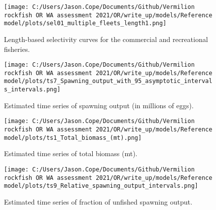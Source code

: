 \documentclass[11pt,
  english,
  a4paper,
]{article}
\begin{document}
\tagmcend\tagstructend


\begin{figure}
\centering
\texttt{[image: C:/Users/Jason.Cope/Documents/Github/Vermilion rockfish OR WA assessment 2021/OR/write\_up/models/Reference model/plots/sel01\_multiple\_fleets\_length1.png]}
\caption{Length-based selectivity curves for the commercial and recreational fisheries.\label{fig:fleet_selectivity}}
\end{figure}

\tagmcend\tagstructend


\begin{figure}
\centering
\texttt{[image: C:/Users/Jason.Cope/Documents/Github/Vermilion rockfish OR WA assessment 2021/OR/write\_up/models/Reference model/plots/ts7\_Spawning\_output\_with\_95\_asymptotic\_intervals\_intervals.png]}
\caption{Estimated time series of spawning output (in millions of eggs).\label{fig:ssb}}
\end{figure}

\tagmcend\tagstructend


\begin{figure}
\centering
\texttt{[image: C:/Users/Jason.Cope/Documents/Github/Vermilion rockfish OR WA assessment 2021/OR/write\_up/models/Reference model/plots/ts1\_Total\_biomass\_(mt).png]}
\caption{Estimated time series of total biomass (mt).\label{fig:tot-bio}}
\end{figure}

\tagmcend\tagstructend


\begin{figure}
\centering
\texttt{[image: C:/Users/Jason.Cope/Documents/Github/Vermilion rockfish OR WA assessment 2021/OR/write\_up/models/Reference model/plots/ts9\_Relative\_spawning\_output\_intervals.png]}
\caption{Estimated time series of fraction of unfished spawning output.\label{fig:depl}}
\end{figure}
\end{document}
